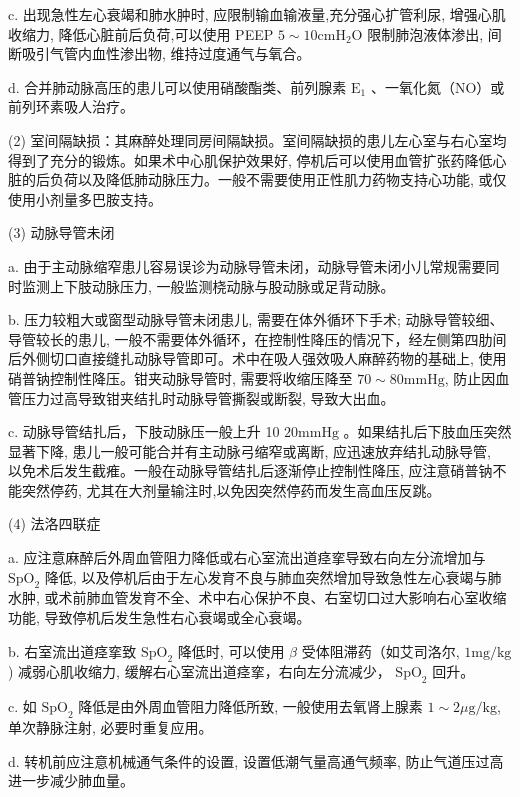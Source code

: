 \documentclass[10pt]{article}
\begin{document}
c. 出现急性左心衰竭和肺水肿时, 应限制输血输液量,充分强心扩管利尿, 增强心肌收缩力, 降低心脏前后负荷,可以使用 PEEP $5 \sim 10 \mathrm{cmH}_{2} \mathrm{O}$ 限制肺泡液体渗出, 间断吸引气管内血性渗出物, 维持过度通气与氧合。

d. 合并肺动脉高压的患儿可以使用硝酸酯类、前列腺素 $\mathrm{E}_{1}$ 、一氧化氮（NO）或前列环素吸人治疗。

(2) 室间隔缺损：其麻醉处理同房间隔缺损。室间隔缺损的患儿左心室与右心室均得到了充分的锻炼。如果术中心肌保护效果好, 停机后可以使用血管扩张药降低心脏的后负荷以及降低肺动脉压力。一般不需要使用正性肌力药物支持心功能, 或仅使用小剂量多巴胺支持。

(3) 动脉导管未闭

a. 由于主动脉缩窄患儿容易误诊为动脉导管未闭，动脉导管未闭小儿常规需要同时监测上下肢动脉压力, 一般监测桡动脉与股动脉或足背动脉。

b. 压力较粗大或窗型动脉导管未闭患儿, 需要在体外循环下手术; 动脉导管较细、导管较长的患儿, 一般不需要体外循环，在控制性降压的情况下，经左侧第四肋间后外侧切口直接缝扎动脉导管即可。术中在吸人强效吸人麻醉药物的基础上, 使用硝普钠控制性降压。钳夹动脉导管时, 需要将收缩压降至 $70 \sim 80 \mathrm{mmHg}$, 防止因血管压力过高导致钳夹结扎时动脉导管撕裂或断裂, 导致大出血。

c. 动脉导管结扎后，下肢动脉压一般上升 10 $20 \mathrm{mmHg}$ 。如果结扎后下肢血压突然显著下降, 患儿一般可能合并有主动脉弓缩窄或离断, 应迅速放弃结扎动脉导管,\\
以免术后发生截痽。一般在动脉导管结扎后逐渐停止控制性降压, 应注意硝普钠不能突然停药, 尤其在大剂量输注时,以免因突然停药而发生高血压反跳。

(4) 法洛四联症

a. 应注意麻醉后外周血管阻力降低或右心室流出道痉挛导致右向左分流增加与 $\mathrm{SpO}_{2}$ 降低, 以及停机后由于左心发育不良与肺血突然增加导致急性左心衰竭与肺水肿, 或术前肺血管发育不全、术中右心保护不良、右室切口过大影响右心室收缩功能, 导致停机后发生急性右心衰竭或全心衰竭。

b. 右室流出道痉挛致 $\mathrm{SpO}_{2}$ 降低时, 可以使用 $\beta$ 受体阻滞药（如艾司洛尔, $1 \mathrm{mg} / \mathrm{kg}$ ) 减弱心肌收缩力, 缓解右心室流出道痉挛，右向左分流减少， $\mathrm{SpO}_{2}$ 回升。

c. 如 $\mathrm{SpO}_{2}$ 降低是由外周血管阻力降低所致, 一般使用去氧肾上腺素 $1 \sim 2 \mu \mathrm{g} / \mathrm{kg}$, 单次静脉注射, 必要时重复应用。

d. 转机前应注意机械通气条件的设置, 设置低潮气量高通气频率, 防止气道压过高进一步减少肺血量。
\end{document}
